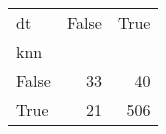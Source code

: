 \begin{tabular}{lrr}
\toprule
dt &  False &  True  \\
knn   &        &        \\
\midrule
False &     33 &     40 \\
True  &     21 &    506 \\
\bottomrule
\end{tabular}
